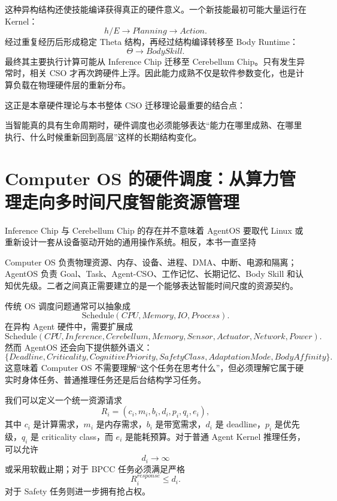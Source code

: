 这种异构结构还使技能编译获得真正的硬件意义。一个新技能最初可能大量运行在 Kernel：
\[
h/E
\rightarrow
Planning
\rightarrow
Action.
\]
经过重复经历后形成稳定 Theta 结构，再经过结构编译转移至 Body Runtime：
\[
\Theta
\rightarrow
BodySkill.
\]
最终其主要执行计算可能从 Inference Chip 迁移至 Cerebellum Chip。只有发生异常时，相关 CSO 才再次跨硬件上浮。因此能力成熟不仅是软件参数变化，也是计算负载在物理硬件层的重新分布。

这正是本章硬件理论与本书整体 CSO 迁移理论最重要的结合点：
\begin{statementbox}
\centering
{}
\end{statementbox}
当智能真的具有生命周期时，硬件调度也必须能够表达“能力在哪里成熟、在哪里执行、什么时候重新回到高层”这样的长期结构变化。

\section{Computer OS 的硬件调度：从算力管理走向多时间尺度智能资源管理}

Inference Chip 与 Cerebellum Chip 的存在并不意味着 AgentOS 要取代 Linux 或重新设计一套从设备驱动开始的通用操作系统。相反，本书一直坚持
\begin{statementbox}
\centering
{}
\end{statementbox}
Computer OS 负责物理资源、内存、设备、进程、DMA、中断、电源和隔离；AgentOS 负责 Goal、Task、Agent-CSO、工作记忆、长期记忆、Body Skill 和认知优先级。二者之间真正需要建立的是一个能够表达智能时间尺度的资源契约。

传统 OS 调度问题通常可以抽象成
\[
\mathrm{Schedule}
(
CPU,
Memory,
IO,
Process
).
\]
在异构 Agent 硬件中，需要扩展成
\[
\mathrm{Schedule}
(
CPU,
Inference,
Cerebellum,
Memory,
Sensor,
Actuator,
Network,
Power
).
\]
然而 AgentOS 还会向下提供额外语义：
\[
\{
Deadline,
Criticality,
CognitivePriority,
SafetyClass,
AdaptationMode,
BodyAffinity
\}.
\]
这意味着 Computer OS 不需要理解“这个任务在思考什么”，但必须理解它属于硬实时身体任务、普通推理任务还是后台结构学习任务。

我们可以定义一个统一资源请求
\[
R_i
=
(
c_i,
m_i,
b_i,
d_i,
p_i,
q_i,
e_i
),
\]
其中 $c_i$ 是计算需求，$m_i$ 是内存需求，$b_i$ 是带宽需求，$d_i$ 是 deadline，$p_i$ 是优先级，$q_i$ 是 criticality class，而 $e_i$ 是能耗预算。对于普通 Agent Kernel 推理任务，可以允许
\[
d_i\rightarrow \infty
\]
或采用软截止期；对于 BPCC 任务必须满足严格
\[
R_i^{response}
\leq
d_i.
\]
对于 Safety 任务则进一步拥有抢占权。

